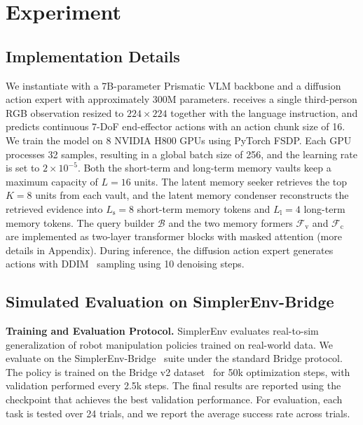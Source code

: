 \section{Experiment}
\label{sec:exper}


\subsection{Implementation Details}
We instantiate \ourmethod with a 7B-parameter Prismatic VLM backbone and a diffusion action expert with approximately 300M parameters.
\ourmethod receives a single third-person RGB observation resized to $224\times224$ together with the language instruction, and predicts continuous 7-DoF end-effector actions with an action chunk size of 16.
We train the model on 8 NVIDIA H800 GPUs using PyTorch FSDP.
Each GPU processes 32 samples, resulting in a global batch size of 256, and the learning rate is set to $2\times10^{-5}$.
Both the short-term and long-term memory vaults keep a maximum capacity of $L=16$ units.
The latent memory seeker retrieves the top $K\!=\!8$ units from each vault, and the latent memory condenser reconstructs the retrieved evidence into $L_\text{s}\!=\!8$ short-term memory tokens and $L_\text{l}\!=\!4$ long-term memory tokens.
The query builder $\mathcal{B}$ and the two memory formers $\mathcal{F}_\text{v}$ and $\mathcal{F}_\text{c}$ are implemented as two-layer transformer blocks with masked attention (more details in Appendix).
During inference, the diffusion action expert generates actions with DDIM~\cite{songdenoising} sampling using 10 denoising steps.


\subsection{Simulated  Evaluation on SimplerEnv-Bridge}
\label{sec:simpler}
\noindent\textbf{Training and Evaluation Protocol.}
SimplerEnv evaluates real-to-sim generalization of robot manipulation policies trained on real-world data.
We evaluate \ourmethod on the SimplerEnv-Bridge~\cite{li2025evaluating} suite under the standard Bridge protocol.
The policy is trained on the Bridge v2 dataset~\cite{walke2023bridgedata} for 50k optimization steps, with validation performed every 2.5k steps.
The final results are reported using the checkpoint that achieves the best validation performance. For evaluation, each task is tested over 24 trials, and we report the average success rate across trials.

